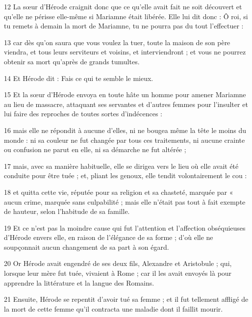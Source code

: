 \par 12 La sœur d'Hérode craignit donc que ce qu'elle avait fait ne soit découvert et qu'elle ne périsse elle-même si Mariamne était libérée. Elle lui dit donc : Ô roi, si tu remets à demain la mort de Mariamne, tu ne pourra pas du tout l’effectuer :

\par 13 car dès qu'on saura que vous voulez la tuer, toute la maison de son père viendra, et tous leurs serviteurs et voisins, et interviendront ; et vous ne pourrez obtenir sa mort qu'après de grands tumultes.

\par 14 Et Hérode dit : Fais ce qui te semble le mieux.

\par 15 Et la sœur d'Hérode envoya en toute hâte un homme pour amener Mariamne au lieu de massacre, attaquant ses servantes et d'autres femmes pour l'insulter et lui faire des reproches de toutes sortes d'indécences :

\par 16 mais elle ne répondit à aucune d'elles, ni ne bougea même la tête le moins du monde : ni sa couleur ne fut changée par tous ces traitements, ni aucune crainte ou confusion ne parut en elle, ni sa démarche ne fut altérée ;

\par 17 mais, avec sa manière habituelle, elle se dirigea vers le lieu où elle avait été conduite pour être tuée ; et, pliant les genoux, elle tendit volontairement le cou :

\par 18 et quitta cette vie, réputée pour sa religion et sa chasteté, marquée par « aucun crime, marquée sans culpabilité ; mais elle n'était pas tout à fait exempte de hauteur, selon l'habitude de sa famille.

\par 19 Et ce n'est pas la moindre cause qui fut l'attention et l'affection obséquieuses d'Hérode envers elle, en raison de l'élégance de sa forme ; d'où elle ne soupçonnait aucun changement de sa part à son égard.

\par 20 Or Hérode avait engendré de ses deux fils, Alexandre et Aristobule ; qui, lorsque leur mère fut tuée, vivaient à Rome ; car il les avait envoyés là pour apprendre la littérature et la langue des Romains.

\par 21 Ensuite, Hérode se repentit d'avoir tué sa femme ; et il fut tellement affligé de la mort de cette femme qu'il contracta une maladie dont il faillit mourir.

